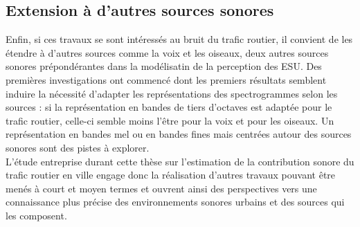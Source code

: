\subsection*{Extension à d'autres sources sonores}

Enfin, si ces travaux se sont intéressés au bruit du trafic routier, il convient de les étendre à d'autres sources comme la voix et les oiseaux, deux autres sources sonores prépondérantes dans la modélisatin de la perception des ESU. Des premières investigations ont commencé dont les premiers résultats semblent induire la nécessité d'adapter les représentations des spectrogrammes selon les sources : si la représentation en bandes de tiers d'octaves est adaptée pour le trafic routier, celle-ci semble moins l'être pour la voix et pour les oiseaux. Un représentation en bandes mel ou en bandes fines mais centrées autour des sources sonores sont des pistes à explorer. \\

L'étude entreprise durant cette thèse sur l'estimation de la contribution sonore du trafic routier en ville engage donc la réalisation d'autres travaux pouvant être menés à court et moyen termes et ouvrent ainsi des perspectives vers une connaissance plus précise des environnements sonores urbains et des sources qui les composent.
